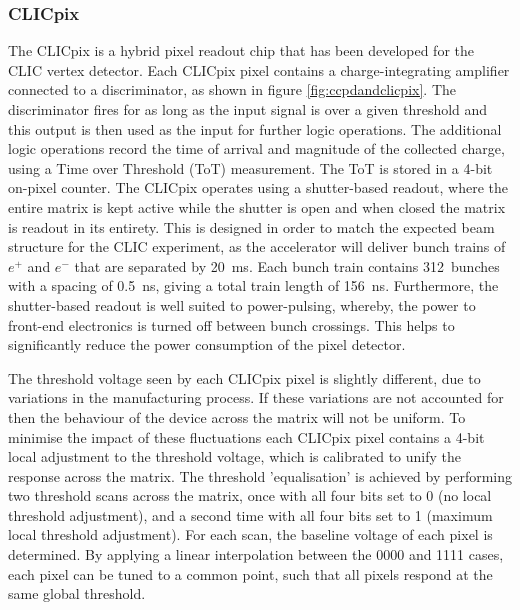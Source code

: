 
\subsubsection{CLICpix}

The CLICpix is a hybrid pixel readout chip that has been developed for the CLIC vertex detector.  Each CLICpix pixel contains a charge-integrating amplifier connected to a discriminator, as shown in figure \ref{fig:ccpdandclicpix}.  The discriminator fires for as long as the input signal is over a given threshold and this output is then used as the input for further logic operations.  The additional logic operations record the time of arrival and magnitude of the collected charge, using a Time over Threshold (ToT) measurement.  The ToT is stored in a 4-bit on-pixel counter.  The CLICpix operates using a shutter-based readout, where the entire matrix is kept active while the shutter is open and when closed the matrix is readout in its entirety.  This is designed in order to match the expected beam structure for the CLIC experiment, as the accelerator will deliver bunch trains of $e^{+}$ and $e^{-}$ that are separated by 20~ms.  Each bunch train contains 312~bunches with a spacing of 0.5~ns, giving a total train length of 156~ns.  Furthermore, the shutter-based readout is well suited to power-pulsing, whereby, the power to front-end electronics is turned off between bunch crossings.  This helps to significantly reduce the power consumption of the pixel detector.

The threshold voltage seen by each CLICpix pixel is slightly different, due to variations in the manufacturing process.  If these variations are not accounted for then the behaviour of the device across the matrix will not be uniform.  To minimise the impact of these fluctuations each CLICpix pixel contains a 4-bit local adjustment to the threshold voltage, which is calibrated to unify the response across the matrix.  The threshold 'equalisation' is achieved by performing two threshold scans across the matrix, once with all four bits set to 0 (no local threshold adjustment), and a second time with all four bits set to 1 (maximum local threshold adjustment).  For each scan, the baseline voltage of each pixel is determined. By applying a linear interpolation between the 0000 and 1111 cases, each pixel can be tuned to a common point, such that all pixels respond at the same global threshold.

